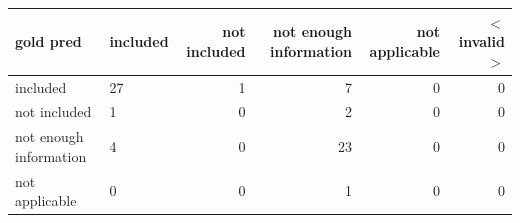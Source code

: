\begin{tabular}{llrrrr}
\toprule
gold  pred & included & not included & not enough information & not applicable & $<$invalid$>$ \\
\midrule
included & 27 & 1 & 7 & 0 & 0 \\
not included & 1 & 0 & 2 & 0 & 0 \\
not enough information & 4 & 0 & 23 & 0 & 0 \\
not applicable & 0 & 0 & 1 & 0 & 0 \\
\bottomrule
\end{tabular}
